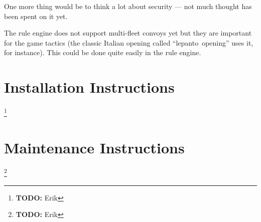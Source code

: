\documentclass[11pt,a4paper]{report}
\newcommand{\todo}[1]{\footnote{{\color{red} {\bf TODO:} #1}}}
\begin{document}
One more thing would be to think a lot about security --- not much thought has been
spent on it yet.

The rule engine does not support multi-fleet convoys yet but they are important for
the game tactics (the classic Italian opening called ``lepanto~opening'' uses it, for
instance). This could be done quite easily in the rule engine.

\appendix
\chapter{Installation Instructions}
\todo{Erik}

\chapter{Maintenance Instructions}
\todo{Erik}
\end{document}
